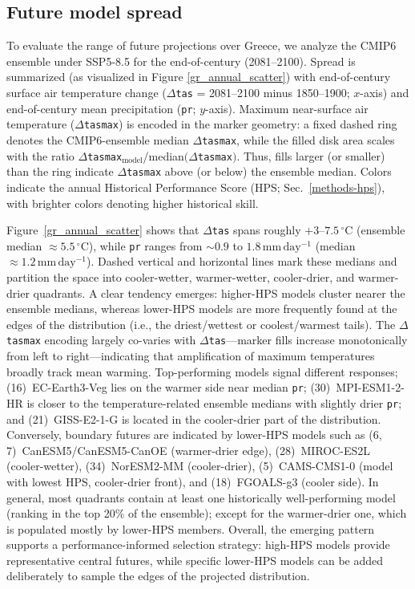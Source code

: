 \documentclass[pdflatex,sn-chicago]{sn-jnl}%
\theoremstyle{thmstyleone}%
\theoremstyle{thmstyletwo}%
\theoremstyle{thmstylethree}%
\begin{document}
\subsection{Future model spread}
To evaluate the range of future projections over Greece, we analyze the CMIP6 ensemble under SSP5-8.5 for the end-of-century (2081--2100). Spread is summarized (as visualized in Figure \ref{gr_annual_scatter}) with end-of-century surface air temperature change (\(\Delta\)\texttt{tas} = 2081--2100 minus 1850--1900; \(x\)-axis) and end-of-century mean precipitation (\texttt{pr}; \(y\)-axis). Maximum near-surface air temperature (\(\Delta\)\texttt{tasmax}) is encoded in the marker geometry: a fixed dashed ring denotes the CMIP6-ensemble median \(\Delta\)\texttt{tasmax}, while the filled disk area scales with the ratio \(\Delta\)\texttt{tasmax}\(_{\text{model}}\)/median\((\Delta\)\texttt{tasmax}\()\). Thus, fills larger (or smaller) than the ring indicate \(\Delta\)\texttt{tasmax} above (or below) the ensemble median. Colors indicate the annual Historical Performance Score (HPS; Sec.~\ref{methods-hps}), with brighter colors denoting higher historical skill.

Figure~\ref{gr_annual_scatter} shows that \(\Delta\)\texttt{tas} spans roughly \(+3\)--\(7.5\,^{\circ}\mathrm{C}\) (ensemble median \(\approx 5.5\,^{\circ}\mathrm{C}\)), while \texttt{pr} ranges from \(\sim 0.9\) to \(1.8\,\mathrm{mm\,day^{-1}}\) (median \(\approx 1.2\,\mathrm{mm\,day^{-1}}\)). Dashed vertical and horizontal lines mark these medians and partition the space into cooler-wetter, warmer-wetter, cooler-drier, and warmer-drier quadrants. A clear tendency emerges: higher-HPS models cluster nearer the ensemble medians, whereas lower-HPS models are more frequently found at the edges of the distribution (i.e., the driest/wettest or coolest/warmest tails). The \(\Delta\)\texttt{tasmax} encoding largely co-varies with \(\Delta\)\texttt{tas}---marker fills increase monotonically from left to right---indicating that amplification of maximum temperatures broadly track mean warming. Top-performing models signal different responses; (16)~EC-Earth3-Veg lies on the warmer side near median \texttt{pr}; (30)~MPI-ESM1-2-HR is closer to the temperature-related ensemble medians with slightly drier \texttt{pr}; and (21)~GISS-E2-1-G is located in the cooler-drier part of the distribution. Conversely, boundary futures are indicated by lower-HPS models such as (6, 7)~CanESM5/CanESM5-CanOE (warmer-drier edge), (28)~MIROC-ES2L (cooler-wetter), (34)~NorESM2-MM (cooler-drier), (5)~CAMS-CMS1-0 (model with lowest HPS, cooler-drier front), and (18)~FGOALS-g3 (cooler side). In general, most quadrants contain at least one historically well-performing model (ranking in the top 20\% of the ensemble); except for the warmer-drier one, which is populated mostly by lower-HPS members. Overall, the emerging pattern supports a performance-informed selection strategy: high-HPS models provide representative central futures, while specific lower-HPS models can be added deliberately to sample the edges of the projected distribution.
\end{document}

